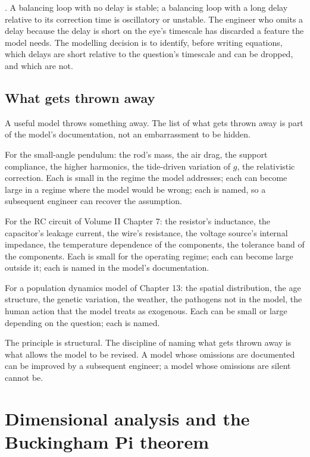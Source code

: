 . A balancing loop with no delay
is stable; a balancing loop with a long delay relative to its
correction time is oscillatory or unstable. The engineer who
omits a delay because the delay is short on the eye's timescale
has discarded a feature the model needs. The modelling decision
is to identify, before writing equations, which delays are short
relative to the question's timescale and can be dropped, and
which are not.

\subsection{What gets thrown away}

A useful model throws something away. The list of what gets
thrown away is part of the model's documentation, not an
embarrassment to be hidden.

For the small-angle pendulum: the rod's mass, the air drag, the
support compliance, the higher harmonics, the tide-driven
variation of $g$, the relativistic correction. Each is small in
the regime the model addresses; each can become large in a
regime where the model would be wrong; each is named, so a
subsequent engineer can recover the assumption.

For the RC circuit of Volume II Chapter 7: the resistor's
inductance, the capacitor's leakage current, the wire's resistance,
the voltage source's internal impedance, the temperature
dependence of the components, the tolerance band of the
components. Each is small for the operating regime; each can
become large outside it; each is named in the model's
documentation.

For a population dynamics model of Chapter 13: the spatial
distribution, the age structure, the genetic variation, the
weather, the pathogens not in the model, the human action that
the model treats as exogenous. Each can be small or large
depending on the question; each is named.

The principle is structural. The discipline of naming what gets
thrown away is what allows the model to be revised. A model whose
omissions are documented can be improved by a subsequent
engineer; a model whose omissions are silent cannot be.

\section{Dimensional analysis and the Buckingham Pi theorem}

